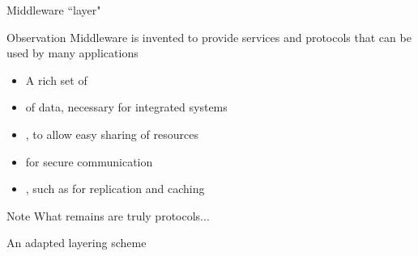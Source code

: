 \begin{slide}{Middleware ``layer"}
  \begin{block}{Observation} 
    Middleware is invented to provide  services and protocols that can be used by many
     applications
    \begin{itemize}\tightlist
    \item A rich set of 
    \item {} of data, necessary for integrated systems
    \item {}, to allow easy sharing of resources
    \item {} for secure communication
    \item {}, such as for replication and caching
    \end{itemize}
  \end{block}
  \begin{alertblock}{Note} 
    What remains are truly  protocols... 
  \end{alertblock}
\end{slide}
\begin{slide}{An adapted layering scheme}
  \begin{block}{}
    \begin{center}
    \end{center}
  \end{block}
\end{slide}
